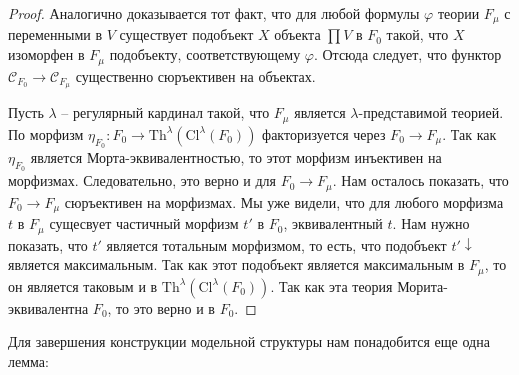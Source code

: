 \documentclass[reqno]{amsart}
\theoremstyle{definition}
\theoremstyle{remark}
\newcommand{\cat}[1]{\mathcal{#1}}
\newcommand{\fs}[1]{\mathrm{#1}}
\begin{document}
\begin{proof}
Аналогично доказывается тот факт, что для любой формулы $\varphi$ теории $F_\mu$ с переменными в $V$ существует подобъект $X$ объекта $\prod V$ в $F_0$ такой, что $X$ изоморфен в $F_\mu$ подобъекту, соответствующему $\varphi$.
Отсюда следует, что функтор $\cat{C}_{F_0} \to \cat{C}_{F_\mu}$ существенно сюръективен на объектах.

Пусть $\lambda$ -- регулярный кардинал такой, что $F_\mu$ является $\lambda$-представимой теорией.
По  морфизм $\eta_{F_0} : F_0 \to \fs{Th}^\lambda(\fs{Cl}^\lambda(F_0))$ факторизуется через $F_0 \to F_\mu$.
Так как $\eta_{F_0}$ является Морта-эквивалентностью, то этот морфизм инъективен на морфизмах.
Следовательно, это верно и для $F_0 \to F_\mu$.
Нам осталось показать, что $F_0 \to F_\mu$ сюръективен на морфизмах.
Мы уже видели, что для любого морфизма $t$ в $F_\mu$ сущесвует частичный морфизм $t'$ в $F_0$, эквивалентный $t$.
Нам нужно показать, что $t'$ является тотальным морфизмом, то есть, что подобъект $t'\!\downarrow$ является максимальным.
Так как этот подобъект является максимальным в $F_\mu$, то он является таковым и в $\fs{Th}^\lambda(\fs{Cl}^\lambda(F_0))$.
Так как эта теория Морита-эквивалентна $F_0$, то это верно и в $F_0$.
\end{proof}

Для завершения конструкции модельной структуры нам понадобится еще одна лемма:
\end{document}
